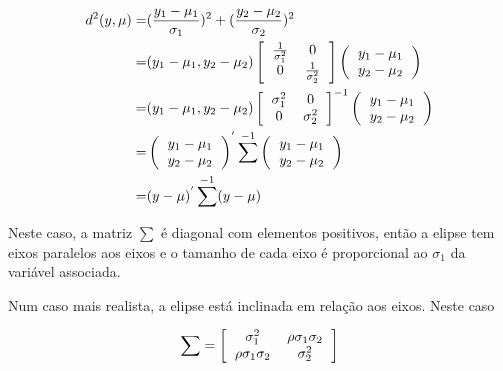 \documentclass[11pt,a4paper]{article}
\begin{document}
		\begin{eqnarray*}
			d^2(y,\mu) = & (\frac{y_1-\mu_1}{\sigma_1})^2+(\frac{y_2-\mu_2}{\sigma_2})^2\\
			=&(y_1-\mu_1,y_2-\mu_2)\left[
			\begin{tabular}{cc}
					$\frac{1}{\sigma_1^2}$ & 0\\
					0&$\frac{1}{\sigma_2^2}$
			\end{tabular}
			\right]
			\left(\begin{tabular}{c}
				$y_1-\mu_1$\\
				$y_2-\mu_2$
			\end{tabular}
			\right)\\
			=&(y_1-\mu_1,y_2-\mu_2)\left[
			\begin{tabular}{cc}
					$\sigma_1^2$ & 0\\
					0&$\sigma_2^2$
			\end{tabular}
			\right]^{-1}
			\left(\begin{tabular}{c}
				$y_1-\mu_1$\\
				$y_2-\mu_2$
			\end{tabular}
			\right)\\
			=&\left(\begin{tabular}{c}
				$y_1-\mu_1$\\
				$y_2-\mu_2$
			\end{tabular}
			\right)^{'}
			\sum^{-1}
			\left(\begin{tabular}{c}
				$y_1-\mu_1$\\
				$y_2-\mu_2$
			\end{tabular}
			\right)\\
			=&(y-\mu)^{'}\sum^{-1}(y-\mu)
		\end{eqnarray*}
		
		Neste caso, a matriz $\sum$ é diagonal com elementos positivos, então a elipse tem eixos paralelos aos eixos e o tamanho de cada eixo é proporcional ao $\sigma_1$ da variável associada.
		
		Num caso mais realista, a elipse está inclinada em relação aos eixos.
		Neste caso
		
		\begin{eqnarray*}
			\sum=\left[\begin{tabular}{cc}
			$\sigma_1^2$&$\rho\sigma_1\sigma_2$\\
			$\rho\sigma_1\sigma_2$&$\sigma_2^2$
			\end{tabular}
			\right]
		\end{eqnarray*}
		
\end{document}
